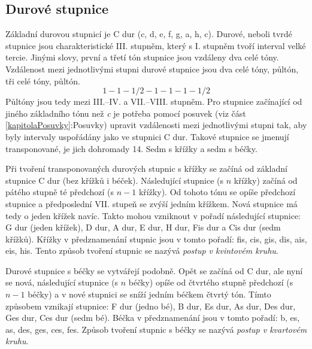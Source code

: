 \subsection{Durové stupnice}
Základní durovou stupnicí je C dur (c, d, e, f, g, a, h, c).
Durové, neboli tvrdé stupnice jsou charakteristické III. stupněm,
který s I. stupněm tvoří interval velké tercie.
Jinými slovy, první a třetí tón stupnice jsou vzdáleny dva celé tóny.
Vzdálenost mezi jednotlivými stupni durové stupnice jsou dva celé tóny, 
půltón, tři celé tóny, půltón.
$$ 1 - 1 - 1/2 - 1 - 1 - 1 - 1/2 $$
Půltóny jsou tedy mezi III.--IV. a VII.--VIII. stupněm.
Pro stupnice začínající od jiného základního tónu než \emph{c} 
je potřeba pomocí posuvek (viz část \ref{kapitolaPosuvky}:Posuvky) 
upravit vzdálenosti mezi jednotlivými stupni tak,
aby byly intervaly uspořádány jako ve stupnici C dur.
Takové stupnice  se jmenují transponované, je jich dohromady 14.
Sedm s křížky a sedm s béčky.
\cite{kofron}
\par

Při tvoření transponovaných durových stupnic s křížky 
se začíná od základní stupnice C dur (bez křížků i béček).
Následující stupnice (s $n$ křížky) začíná od pátého stupně té předchozí (s $n-1$ křížky).
Od tohoto tónu se opíše předchozí stupnice 
a předposlední VII. stupeň se zvýší jedním křížkem.
Nová stupnice má tedy o jeden křížek navíc.
Takto mohou vzniknout v pořadí následující stupnice: 
G dur (jeden křížek), D dur, A dur, E dur, H dur, Fis dur a Cis dur (sedm křížků).
Křížky v předznamenání stupnic jsou v tomto pořadí:
fis, cis, gis, dis, ais, eis, his.
Tento způsob tvoření stupnic se nazývá \emph{postup v kvintovém kruhu}.
\cite{kofron}
\par

Durové stupnice s béčky se vytvářejí podobně.
Opět se začíná od C dur, ale nyní se nová, 
následující stupnice (s $n$ béčky) opíše od čtvrtého stupně předchozí (s $n-1$ béčky)
a v nové stupnici se sníží jedním béčkem čtvrtý tón.
Tímto způsobem vznikají stupnice:
F dur (jedno bé), B dur, Es dur, As dur, Des dur, Ges dur, Ces dur (sedm bé).
Béčka v předznamenání jsou v tomto pořadí:
b, es, as, des, ges, ces, fes.
Způsob tvoření stupnic s béčky se nazývá \emph{postup v kvartovém kruhu}.
\cite{kofron}
\par

